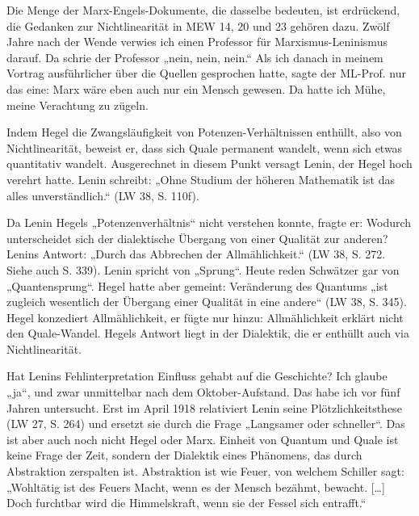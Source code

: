 \documentclass[11pt,a4paper]{article}
\begin{document}
Die Menge der Marx-Engels-Dokumente, die dasselbe bedeuten, ist erdrückend,
die Gedanken zur Nichtlinearität in MEW 14, 20 und 23 gehören dazu. Zwölf
Jahre nach der Wende verwies ich einen Professor für Marxismus-Leninismus
darauf. Da schrie der Professor „nein, nein, nein.“ Als ich danach in meinem
Vortrag ausführlicher über die Quellen gesprochen hatte, sagte der ML-Prof.
nur das eine: Marx wäre eben auch nur ein Mensch gewesen. Da hatte ich Mühe,
meine Verachtung zu zügeln.

Indem Hegel die Zwangsläufigkeit von Potenzen-Verhältnissen enthüllt, also von
Nichtlinearität, beweist er, dass sich Quale permanent wandelt, wenn sich
etwas quantitativ wandelt. Ausgerechnet in diesem Punkt versagt Lenin, der
Hegel hoch verehrt hatte. Lenin schreibt: „Ohne Studium der höheren Mathematik
ist das alles unverständlich.“ (LW 38, S. 110f).

Da Lenin Hegels „Potenzenverhältnis“ nicht verstehen konnte, fragte er:
Wodurch unterscheidet sich der dialektische Übergang von einer Qualität zur
anderen? Lenins Antwort: „Durch das Abbrechen der Allmählichkeit.“ (LW 38,
S. 272. Siehe auch S. 339). Lenin spricht von „Sprung“. Heute reden Schwätzer
gar von „Quantensprung“. Hegel hatte aber gemeint: Veränderung des Quantums
„ist zugleich wesentlich der Übergang einer Qualität in eine andere“ (LW 38,
S. 345). Hegel konzediert Allmählichkeit, er fügte nur hinzu: Allmählichkeit
erklärt nicht den Quale-Wandel. Hegels Antwort liegt in der Dialektik, die er
enthüllt auch via Nichtlinearität.

Hat Lenins Fehlinterpretation Einfluss gehabt auf die Geschichte? Ich glaube
„ja“, und zwar unmittelbar nach dem Oktober-Aufstand. Das habe ich vor fünf
Jahren untersucht. Erst im April 1918 relativiert Lenin seine
Plötzlichkeitsthese (LW 27, S. 264) und ersetzt sie durch die Frage „Langsamer
oder schneller“. Das ist aber auch noch nicht Hegel oder Marx. Einheit von
Quantum und Quale ist keine Frage der Zeit, sondern der Dialektik eines
Phänomens, das durch Abstraktion zerspalten ist. Abstraktion ist wie Feuer,
von welchem Schiller sagt: „Wohltätig ist des Feuers Macht, wenn es der Mensch
bezähmt, bewacht. [\ldots] Doch furchtbar wird die Himmelskraft, wenn sie der
Fessel sich entrafft.“
\end{document}
